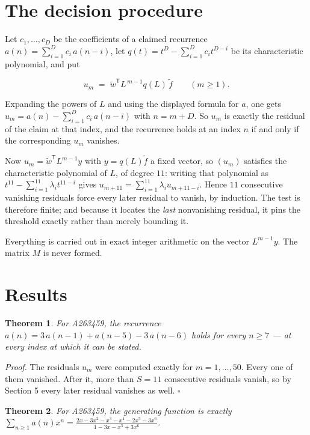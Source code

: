 \documentclass[11pt]{article}
\newtheorem{theorem}{Theorem}
\theoremstyle{definition}
\begin{document}
\section{The decision procedure}

Let $c_1,\dots,c_D$ be the coefficients of a claimed recurrence $a(n) = \sum_{i=1}^{D} c_i\,a(n-i)$, let $q(t) = t^{D} - \sum_{i=1}^{D} c_i t^{D-i}$ be its characteristic polynomial, and put

\[u_m \;=\; \tilde w^{\mathsf T} L^{\,m-1} q(L)\,\tilde f \qquad (m \ge 1).\]

Expanding the powers of $L$ and using the displayed formula for $a$, one gets $u_m = a(n) - \sum_{i=1}^{D} c_i\,a(n-i)$ with $n = m + D$. So $u_m$ is exactly the residual of the claim at that index, and the recurrence holds at an index $n$ if and only if the corresponding $u_m$ vanishes.

Now $u_m = \tilde w^{\mathsf T} L^{m-1} y$ with $y = q(L)\tilde f$ a fixed vector, so $(u_m)$ satisfies the characteristic polynomial of $L$, of degree $11$: writing that polynomial as $t^{11} - \sum_{i=1}^{11} \lambda_i t^{11-i}$ gives $u_{m+11} = \sum_{i=1}^{11} \lambda_i u_{m+11-i}$. Hence $11$ consecutive vanishing residuals force every later residual to vanish, by induction. The test is therefore finite; and because it locates the {\itshape last} nonvanishing residual, it pins the threshold exactly rather than merely bounding it.

Everything is carried out in exact integer arithmetic on the vector $L^{m-1}y$. The matrix $M$ is never formed.

\section{Results}

\begin{theorem} For A263459, the recurrence $a(n) = 3\,a(n-1) + a(n-5) - 3\,a(n-6)$ holds for every $n \ge 7$ --- at every index at which it can be stated.\end{theorem}

{\itshape Proof.} The residuals $u_m$ were computed exactly for $m = 1,\dots,50$. Every one of them vanished. After it, more than $S = 11$ consecutive residuals vanish, so by Section 5 every later residual vanishes as well. $\square$

\begin{theorem} For A263459, the generating function is exactly $\sum_{n\ge 1} a(n)x^n = \frac{2x - 3x^{2} - x^{3} - x^{4} - 2x^{5} - 3x^{6}}{1 - 3x - x^{5} + 3x^{6}}$.\end{theorem}
\end{document}
